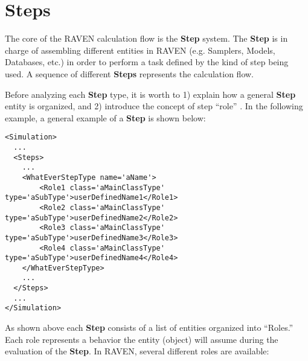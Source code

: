 \section{Steps}
\label{sec:steps}
The core of the RAVEN calculation flow is the \textbf{Step} system.
%
The \textbf{Step} is in charge of assembling different entities in RAVEN (e.g.
Samplers, Models, Databases, etc.) in order to perform a task defined by the
kind of step being used.
%
A sequence of different \textbf{Steps} represents the calculation flow.
%

Before analyzing each \textbf{Step} type, it is worth to 1)
explain how a general \textbf{Step} entity is organized, and 2) introduce the concept of step
``role'' .
%
In the following example, a general example of a \textbf{Step} is shown below:
\begin{lstlisting}[style=XML,morekeywords={class}]
<Simulation>
  ...
  <Steps>
    ...
    <WhatEverStepType name='aName'>
        <Role1 class='aMainClassType' type='aSubType'>userDefinedName1</Role1>
        <Role2 class='aMainClassType' type='aSubType'>userDefinedName2</Role2>
        <Role3 class='aMainClassType' type='aSubType'>userDefinedName3</Role3>
        <Role4 class='aMainClassType' type='aSubType'>userDefinedName4</Role4>
    </WhatEverStepType>
    ...
  </Steps>
  ...
</Simulation>
\end{lstlisting}
As shown above each \textbf{Step} consists of
a list of entities organized into ``Roles.''
%
Each role represents a behavior the entity (object) will assume during the
evaluation of the \textbf{Step}.
%
In RAVEN, several different roles are available:
